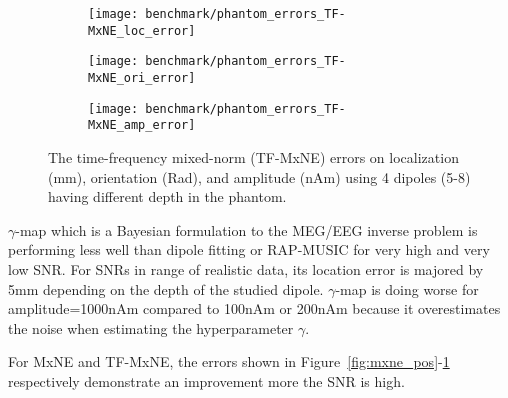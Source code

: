 \begin{sidewaysfigure}[ht]
        \centering
        \begin{subfigure}[b]{0.28\textwidth}
            \centering
            \texttt{[image: benchmark/phantom\_errors\_TF-MxNE\_loc\_error]}
            \label{fig:tfmxne_pos}
        \end{subfigure}
		\hspace{35pt}
        \begin{subfigure}[b]{0.28\textwidth}  
            \centering 
            \texttt{[image: benchmark/phantom\_errors\_TF-MxNE\_ori\_error]}
            \label{fig:tfmxne_ori}
        \end{subfigure}
		\hspace{35pt}
        \begin{subfigure}[b]{0.28\textwidth}   
            \centering 
            \texttt{[image: benchmark/phantom\_errors\_TF-MxNE\_amp\_error]}
            \label{fig:tfmxne_amp}
        \end{subfigure}

		\caption{The time-frequency mixed-norm (TF-MxNE) errors on localization (mm), orientation (Rad), and amplitude (nAm) using 4 dipoles (5-8) having different depth in the phantom.\label{fig:tfmxne_errors}}
\end{sidewaysfigure}

$\gamma$-map which is a Bayesian formulation to the MEG/EEG inverse problem is performing less well than dipole fitting or RAP-MUSIC for very high and very low SNR. For SNRs in range of realistic data, its location error is majored by 5mm depending on the depth of the studied dipole. $\gamma$-map is doing worse for amplitude=1000nAm compared to 100nAm or 200nAm because it overestimates the noise when estimating the hyperparameter $\gamma$.

For MxNE and TF-MxNE, the errors shown in Figure~\ref{fig:mxne_pos}-\ref{fig:tfmxne_pos} respectively demonstrate an improvement more the SNR is high.

